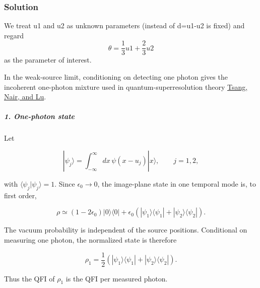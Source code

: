 \subsubsection*{Solution}

{\color{blue}
We treat u1 and u2 as unknown parameters (instead of d=u1-u2 is fixed) and regard
\[
\theta=\frac13u1+\frac23u2
\]
as the parameter of interest.
}

In the weak-source limit, conditioning on detecting one photon gives the incoherent one-photon mixture used in quantum-superresolution theory \href{\detokenize{https://journals.aps.org/prx/abstract/10.1103/PhysRevX.6.031033}}{Tsang, Nair, and Lu}.

\subparagraph*{1. One-photon state}

Let

\[
|\psi_j\rangle = \int_{-\infty}^{\infty}dx\,\psi(x-u_j)|x\rangle, \qquad j=1,2,
\]

with $\langle\psi_j|\psi_j\rangle=1$. Since $\epsilon_0\to0$, the image-plane state in one temporal mode is, to first order,

\[
\rho\simeq (1-2\epsilon_0)|0\rangle\langle0| + \epsilon_0 \left( |\psi_1\rangle\langle\psi_1| + |\psi_2\rangle\langle\psi_2| \right).
\]

The vacuum probability is independent of the source positions. Conditional on measuring one photon, the normalized state is therefore

\[
\rho_1 = \frac{1}{2} \left( |\psi_1\rangle\langle\psi_1| + |\psi_2\rangle\langle\psi_2| \right).
\]

Thus the QFI of $\rho_1$ is the QFI per measured photon.

